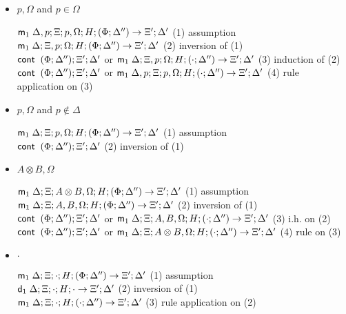 \documentclass[9pt]{article}
\begin{document}
\begin{itemize}
\item $p, \Omega$ and $p \in \Omega$

$\mathsf{m}_1 \; \Delta, p; \Xi; p, \Omega; H; (\Phi; \Delta'') \rightarrow \Xi'; \Delta'$ \hfill (1) assumption\\
$\mathsf{m}_1 \; \Delta; \Xi, p; \Omega; H; (\Phi; \Delta'') \rightarrow \Xi'; \Delta'$ \hfill (2) inversion of (1)\\
$\mathsf{cont} \; \; (\Phi; \Delta'') ; \Xi'; \Delta'$ or $\mathsf{m}_1 \; \Delta; \Xi, p; \Omega; H; (\cdot; \Delta'') \rightarrow \Xi'; \Delta'$ \hfill (3) induction of (2) \\
$\mathsf{cont} \; \; (\Phi; \Delta'') ; \Xi'; \Delta'$ or $\mathsf{m}_1 \; \Delta, p; \Xi; p, \Omega; H; (\cdot; \Delta'') \rightarrow \Xi'; \Delta'$ \hfill (4) rule application on (3) \\

\item $p, \Omega$ and $p \notin \Delta$

$\mathsf{m}_1 \; \Delta; \Xi; p, \Omega; H; (\Phi; \Delta'') \rightarrow \Xi'; \Delta'$ \hfill (1) assumption \\
$\mathsf{cont} \; \; (\Phi; \Delta''); \Xi'; \Delta'$ \hfill (2) inversion of (1) \\

\item $A \otimes B, \Omega$

$\mathsf{m}_1 \; \Delta; \Xi; A \otimes B, \Omega; H; (\Phi; \Delta'') \rightarrow \Xi'; \Delta'$ \hfill (1) assumption \\
$\mathsf{m}_1 \; \Delta; \Xi; A, B, \Omega; H; (\Phi; \Delta'') \rightarrow \Xi'; \Delta'$ \hfill (2) inversion of (1) \\
$\mathsf{cont} \; \; (\Phi; \Delta''); \Xi'; \Delta'$ or $\mathsf{m}_1 \; \Delta; \Xi; A, B, \Omega; H; (\cdot; \Delta'') \rightarrow \Xi'; \Delta'$ \hfill (3) i.h. on (2) \\
$\mathsf{cont} \; \; (\Phi; \Delta''); \Xi'; \Delta'$ or $\mathsf{m}_1 \; \Delta; \Xi; A \otimes B, \Omega; H; (\cdot; \Delta'') \rightarrow \Xi'; \Delta'$ \hfill (4) rule on (3) \\

\item $\cdot$

$\mathsf{m}_1 \; \Delta; \Xi; \cdot; H; (\Phi; \Delta'') \rightarrow \Xi'; \Delta'$ \hfill (1) assumption \\
$\mathsf{d}_1 \; \Delta; \Xi; \cdot; H; \cdot \rightarrow \Xi'; \Delta'$ \hfill (2) inversion of (1) \\
$\mathsf{m}_1 \; \Delta; \Xi; \cdot; H; (\cdot; \Delta'') \rightarrow \Xi'; \Delta'$ \hfill (3) rule application on (2) \\
\end{itemize}
\end{document}
